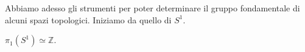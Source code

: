 Abbiamo adesso gli strumenti per poter determinare il gruppo fondamentale di alcuni spazi topologici. Iniziamo da quello di $S^1$.

\begin{thm}
  $\pi_1(S^1) \simeq \mathbb{Z}$.
\end{thm}
